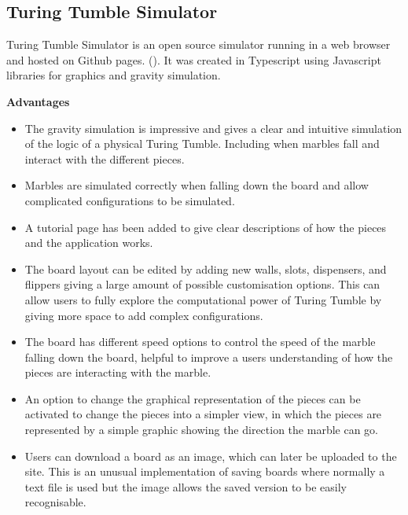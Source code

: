 \documentclass{l4proj}
\begin{document}
\subsection{Turing Tumble Simulator}
Turing Tumble Simulator is an open source simulator running in a web browser and hosted on Github pages. (\cite{turing_tumble_simulator}). It was created in Typescript using Javascript libraries for graphics and gravity simulation. 

\textbf{Advantages}
\begin{itemize}
    \item The gravity simulation is impressive and gives a clear and intuitive simulation of the logic of a physical Turing Tumble. Including when marbles fall and interact with the different pieces.
    \item Marbles are simulated correctly when falling down the board and allow complicated configurations to be simulated.
    \item A tutorial page has been added to give clear descriptions of how the pieces and the application works.
    \item The board layout can be edited by adding new walls, slots, dispensers, and flippers giving a large amount of possible customisation options. This can allow users to fully explore the computational power of Turing Tumble by giving more space to add complex configurations.
    \item The board has different speed options to control the speed of the marble falling down the board, helpful to improve a users understanding of how the pieces are interacting with the marble.
    \item An option to change the graphical representation of the pieces can be activated to change the pieces into a simpler view, in which the pieces are represented by a simple graphic showing the direction the marble can go.
    \item Users can download a board as an image, which can later be uploaded to the site. This is an unusual implementation of saving boards where normally a text file is used but the image allows the saved version to be easily recognisable.
\end{itemize}
\end{document}
